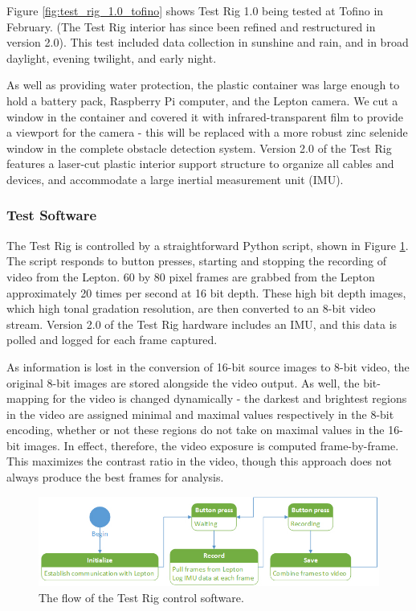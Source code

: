 Figure \ref{fig:test_rig_1.0_tofino} shows Test Rig 1.0 being tested at Tofino in February. (The Test Rig interior has since been refined and restructured in version 2.0). This test included data collection in sunshine and rain, and in broad daylight, evening twilight, and early night.

As well as providing water protection, the plastic container was large enough to hold a battery pack, Raspberry Pi computer, and  the Lepton camera. We cut a window in the container and covered it with infrared-transparent film to provide a viewport for the camera - this will be replaced with a more robust zinc selenide window in the complete obstacle detection system.  Version 2.0 of the Test Rig features a laser-cut plastic interior support structure to organize all cables and devices, and accommodate a large inertial measurement unit (IMU).  

\subsubsection{\label{sec:discussion:equipment:software}Test Software}
The Test Rig is controlled by a straightforward Python script, shown in Figure \ref{fig:test-rig-software}. The script responds to button presses, starting and stopping the recording of video from the Lepton. 60 by 80 pixel frames are grabbed from the Lepton approximately 20 times per second at 16 bit depth. These high bit depth images, which high tonal gradation resolution, are then converted to an 8-bit video stream. Version 2.0 of the Test Rig hardware includes an IMU, and this data is polled and logged for each frame captured.

As information is lost in the conversion of 16-bit source images to 8-bit video, the original 8-bit images are stored alongside the video output. As well, the bit-mapping for the video is changed dynamically - the darkest and brightest regions in the video are assigned minimal and maximal values respectively in the 8-bit encoding, whether or not these regions do not take on maximal values in the 16-bit images. In effect, therefore, the video exposure is computed frame-by-frame. This maximizes the contrast ratio in the video, though this approach does not always produce the best frames for analysis.

\begin{figure}
\centering
\includegraphics[width=\linewidth]{"./image/button_py"}
\caption[Test Rig software flow]{\label{fig:test-rig-software}The flow of the Test Rig control software.}
\end{figure}

